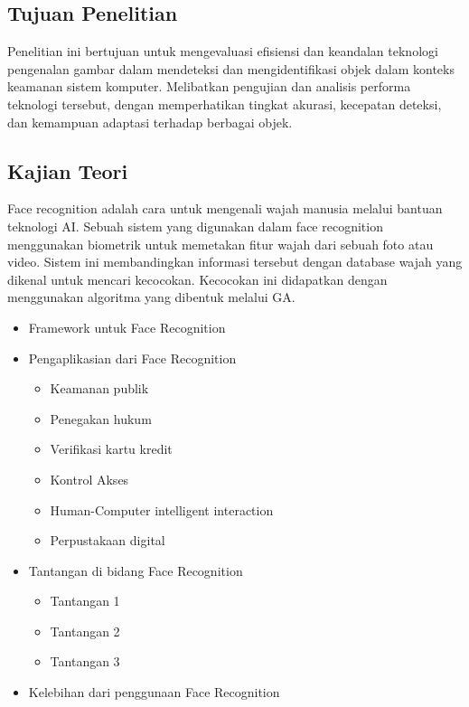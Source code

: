 \documentclass[conference]{IEEEtran}
\begin{document}
\subsection{Tujuan Penelitian}
Penelitian ini bertujuan untuk mengevaluasi efisiensi dan keandalan teknologi pengenalan gambar dalam mendeteksi dan mengidentifikasi objek dalam konteks keamanan sistem komputer. Melibatkan pengujian dan analisis performa teknologi tersebut, dengan memperhatikan tingkat akurasi, kecepatan deteksi, dan kemampuan adaptasi terhadap berbagai objek.

\subsection{Kajian Teori}
Face recognition adalah cara untuk mengenali wajah manusia melalui bantuan teknologi AI. Sebuah sistem yang digunakan dalam face recognition menggunakan biometrik untuk memetakan fitur wajah dari sebuah foto atau video. Sistem ini membandingkan informasi tersebut dengan database wajah yang dikenal untuk mencari kecocokan. Kecocokan ini didapatkan dengan menggunakan algoritma yang dibentuk melalui GA.

\begin{itemize}
    \item Framework untuk Face Recognition
    \item Pengaplikasian dari Face Recognition
    \begin{itemize}
        \item Keamanan publik
        \item Penegakan hukum
        \item Verifikasi kartu kredit
        \item Kontrol Akses
        \item Human-Computer intelligent interaction
        \item Perpustakaan digital
    \end{itemize}
    \item Tantangan di bidang Face Recognition
    \begin{itemize}
        \item Tantangan 1
        \item Tantangan 2
        \item Tantangan 3
    \end{itemize}
    \item Kelebihan dari penggunaan Face Recognition
\end{itemize}
\end{document}
